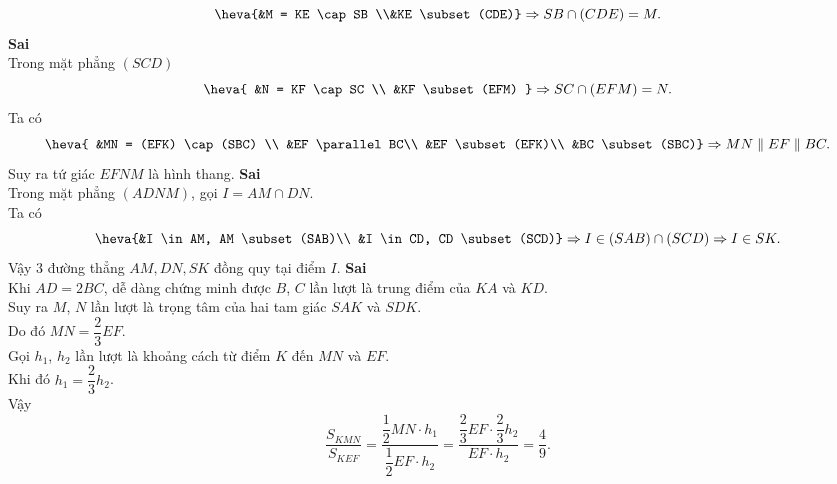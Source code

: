 \begin{ex}
{\begin{itemchoice}
			 \[
			\heva{&M = KE \cap SB \\&KE \subset (CDE)} 
			\Rightarrow SB \cap (CDE) = M. 
			 \]
			\itemch \textbf{Sai}  \\
			 Trong mặt phẳng $(SCD)$\\
			\[ 
			\heva{ 
			&N = KF  \cap SC \\
			&KF  \subset (EFM)
			} 
			 \Rightarrow SC \cap (EFM) = N.
			\] 
			 Ta có
			 \[
			 \heva{
			&MN  = (EFK) \cap (SBC) \\
			&EF  \parallel BC\\
			&EF \subset  (EFK)\\
			&BC \subset (SBC)} 
			 \Rightarrow MN \parallel EF \parallel BC.
			 \]
			Suy ra tứ  giác $EFNM$ là hình thang.
			\itemch  \textbf{Sai}\\
			Trong mặt phẳng $(ADNM)$, gọi $I = AM \cap DN$.  \\
			Ta  có
			 \[
			\heva{&I \in AM, AM \subset (SAB)\\ &I \in CD, CD \subset  (SCD)}
			 \Rightarrow I \in (SAB) \cap (SCD)
			\Rightarrow I \in SK. 
			\] 
			Vậy $3$ đường thẳng $AM, DN, SK$ đồng quy tại điểm $I$. 
			\itemch \textbf{Sai} \\ 
			Khi $AD = 2BC$, dễ dàng chứng minh được $B$, $C$ lần  lượt là trung điểm của $KA$ và $KD$. \\
			Suy ra $M$, $N$  lần lượt là trọng tâm của hai tam giác $SAK$ và $SDK$.\\
			Do đó $MN =  \dfrac{2}{3}EF$.\\
			Gọi $h_1$, $h_2$ lần lượt  là khoảng cách từ điểm $K$ đến $MN$ và $EF$.\\
			Khi đó $h_1 =  \dfrac{2}{3}h_2$.\\
			Vậy 
			\[ 
			\dfrac{S_{KMN}}{S_{KEF}} = \dfrac{\dfrac{1}{2}MN \cdot h_1}{\dfrac{1}{2}EF \cdot h_2} =  \dfrac{\dfrac{2}{3}EF \cdot \dfrac{2}{3}h_2}{EF \cdot h_2} = \dfrac{4}{9}.
			 \]
		\end{itemchoice}
	} 
\end{ex}



